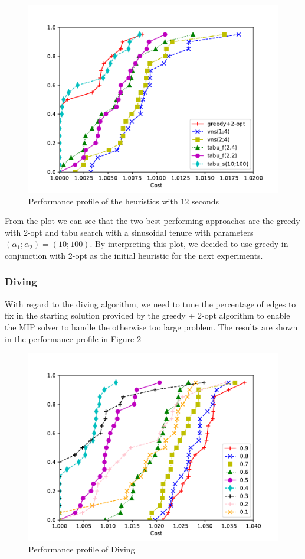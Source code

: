 \documentclass{article}
\begin{document}
\begin{figure}[ht]
        \caption{Performance profile of the heuristics with $12$ seconds}
        \label{fig:ht_best12}
        \centering
        \includegraphics[width=340pt]{assets/ht_best12.pdf}
\end{figure}

From the plot we can see that the two best performing approaches are the greedy
with 2-opt and tabu search with a sinusoidal tenure with parameters
$\left(\alpha_1; \alpha_2\right) = \left(10;100\right)$.
By interpreting this plot, we decided to use greedy in conjunction with 2-opt
as the initial heuristic for the next experiments.

\clearpage
\subsubsection{Diving}
With regard to the diving algorithm, we need to tune the percentage of edges to fix
in the starting solution provided by the greedy + 2-opt algorithm
to enable the MIP solver to handle the otherwise too large problem.
The results are shown in the performance profile in Figure \ref{fig:ht_diving}

\begin{figure}[ht]
        \caption{Performance profile of Diving}
        \label{fig:ht_diving}
        \centering
        \includegraphics[width=340pt]{assets/ht_diving.pdf}
\end{figure}
\end{document}
